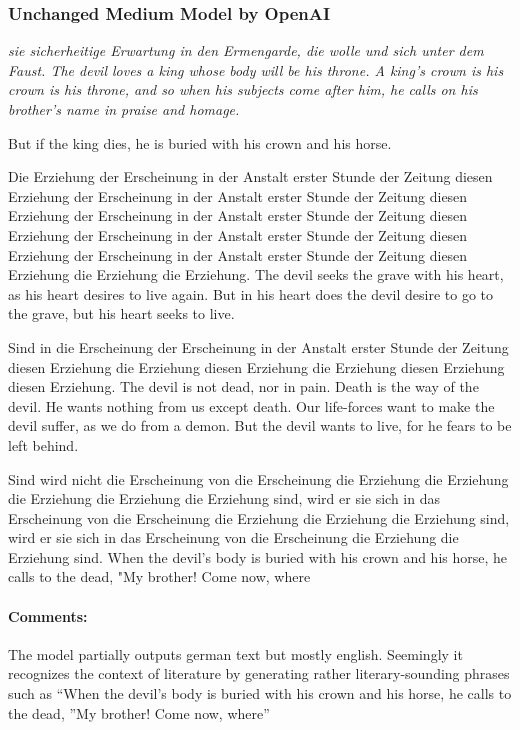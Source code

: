 \documentclass{scrartcl}
\begin{document}
\subsubsection{Unchanged Medium Model by OpenAI}
{\itshape
sie sicherheitige Erwartung in den Ermengarde, die wolle und sich unter dem Faust. The devil loves a king whose body will be his throne. A king's crown is his crown is his throne, and so when his subjects come after him, he calls on his brother's name in praise and homage.

But if the king dies, he is buried with his crown and his horse.

Die Erziehung der Erscheinung in der Anstalt erster Stunde der Zeitung diesen Erziehung der Erscheinung in der Anstalt erster Stunde der Zeitung diesen Erziehung der Erscheinung in der Anstalt erster Stunde der Zeitung diesen Erziehung der Erscheinung in der Anstalt erster Stunde der Zeitung diesen Erziehung der Erscheinung in der Anstalt erster Stunde der Zeitung diesen Erziehung die Erziehung die Erziehung. The devil seeks the grave with his heart, as his heart desires to live again. But in his heart does the devil desire to go to the grave, but his heart seeks to live.

Sind in die Erscheinung der Erscheinung in der Anstalt erster Stunde der Zeitung diesen Erziehung die Erziehung diesen Erziehung die Erziehung diesen Erziehung diesen Erziehung. The devil is not dead, nor in pain. Death is the way of the devil. He wants nothing from us except death. Our life-forces want to make the devil suffer, as we do from a demon. But the devil wants to live, for he fears to be left behind.

Sind wird nicht die Erscheinung von die Erscheinung die Erziehung die Erziehung die Erziehung die Erziehung die Erziehung sind, wird er sie sich in das Erscheinung von die Erscheinung die Erziehung die Erziehung die Erziehung sind, wird er sie sich in das Erscheinung von die Erscheinung die Erziehung die Erziehung sind. When the devil's body is buried with his crown and his horse, he calls to the dead, "My brother! Come now, where
}
\paragraph{Comments:}
The model partially outputs german text but mostly english. Seemingly it recognizes the context of literature by generating rather literary-sounding phrases such as \enquote{When the devil’s
body is buried with his crown and his horse, he calls to the dead, ”My brother! Come	now, where} 
\end{document}
